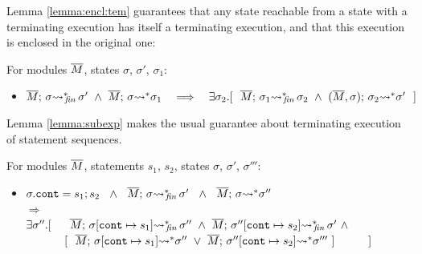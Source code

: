 \label{sect:termExecs}

 
Lemma \ref{lemma:encl:tem} guarantees that any state reachable from a state with a terminating execution has itself a terminating execution, and that this execution is enclosed in the original one:
 
 \begin{auxLemma}
 \label{lemma:encl:tem}
 For   modules $\overline{M}$,   states $\sigma$, $\sigma'$, $\sigma_1$:
\begin{itemize}
\item
$  \leadstoBoundedStarFin {\Mtwo}  {\sigma}  {\sigma'} \  \wedge \  \leadstoBoundedStar  {\Mtwo}  {\sigma}  {\sigma_1} 
\ \ \  \Longrightarrow\ \ \  %
 \exists \sigma_2.[\ \ \leadstoBoundedStarFin {\Mtwo} {\sigma_1}  {\sigma_2}  
\ \wedge\ 
\leadstoBoundedStarThree  {\Mtwo}  {\sigma_2}  {\sigma}   {\sigma'} \ \ ]$
\end{itemize}

\end{auxLemma} 
 
Lemma \ref{lemma:subexp} makes the usual guarantee about terminating execution of statement sequences.
  
\begin{auxLemma}
\label{lemma:subexp}
For modules $\overline{M}$, statements $s_1$, $s_2$,  states $\sigma$, $\sigma'$, $\sigma'''$:
\begin{itemize}
\item
$ \sigma.\texttt{cont} = s_1; s_2 \ \ \wedge\ \  \leadstoBoundedStarFin {\Mtwo}  {\sigma}  {\sigma'}\ \ 
\wedge \ \
\leadstoBoundedStar {\Mtwo}  {\sigma}  {\sigma''}\
$\\
$  \Longrightarrow$\\
$   \exists \sigma''.[\ \ \ \ \   \leadstoBoundedStarFin {\Mtwo} {\sigma[\texttt{cont}\mapsto s_1]}  {\sigma''}  
\ \wedge\ 
\leadstoBoundedStarFin {\Mtwo} {\sigma''[\texttt{cont}\mapsto s_2]}   {\sigma'} \  \wedge$
\\
$\strut \hspace{1.2cm}  [ \ \ \overline{M};\, {\sigma[\texttt{cont}\mapsto s_1]} {\rightsquigarrow^*} \sigma''\ \vee \ \overline{M};\, {\sigma''[\texttt{cont}\mapsto s_2]} {\rightsquigarrow^*} \sigma'''\ ]\ \ \ \ \ \ \ \  \ ] $
\end{itemize}
\end{auxLemma}
 

